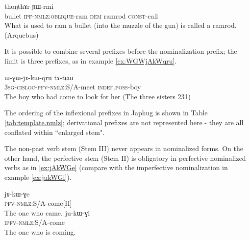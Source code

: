 \documentclass[oldfontcommands,oneside,a4paper,11pt]{article}
\newcommand{\ipa}[1]{{\phon #1}} %
\begin{document}
  
 \begin{exe}
\ex \label{ex:thongthar}
\gll [\ipa{qandʑi}   	\ipa{chɯ-sɤ-ɣnda}]   	\ipa{nɯ}   	\ipa{thoŋthɤr}   	  	\ipa{ɲɯ-rmi}    \\
bullet \textsc{ipf}-\textsc{nmlz:oblique}-ram   \textsc{dem} ramrod \textsc{const}-call \\
 \glt What is used to ram a bullet (into the muzzle of the gun) is called a ramrod. (Arquebus)
 \end{exe}

It is possible to combine several prefixes before the nominalization prefix; the limit is three prefixes, as in example \ref{ex:WGWjAkWqru}.
 \begin{exe}
\ex \label{ex:WGWjAkWqru}
\gll
  	\ipa{ɯ-ɣɯ-jɤ-kɯ-qru}  	\ipa{tɤ-tɕɯ}  	   \\
  \textsc{3sg-cisloc-pfv-nmlz:}S/A-meet \textsc{indef.poss}-boy   \\
\glt The boy  who had come to look for her (The three sisters 231)
 \end{exe}
 
The ordering of the inflexional prefixes in  Japhug is shown in Table \ref{tab:template.nmlz}; derivational prefixes are not represented here - they are all conflated within   ``enlarged stem".



\begin{table}[H]
\caption{The template of nominalized verbal forms in Japhug} \centering \label{tab:template.nmlz}
\end{table}

The non-past verb stem (Stem III) never appears in nominalized forms. On the other hand, the perfective stem (Stem II) is obligatory in perfective nominalized verbs as in \ref{ex:jAkWGe} (compare with the imperfective nominalization in example \ref{ex:jukWGi}).

 \begin{exe}
\ex \label{ex:jAkWGe}
\gll
  	\ipa{jɤ-kɯ-ɣe}	   \\
  \textsc{pfv-nmlz:}S/A-come[II]   \\
\glt The one who came.
\ex \label{ex:jukWGi}
\gll
  	\ipa{ju-kɯ-ɣi}	   \\
  \textsc{ipfv-nmlz:}S/A-come   \\
\glt The one who is coming.
 \end{exe}
 
\end{document}

